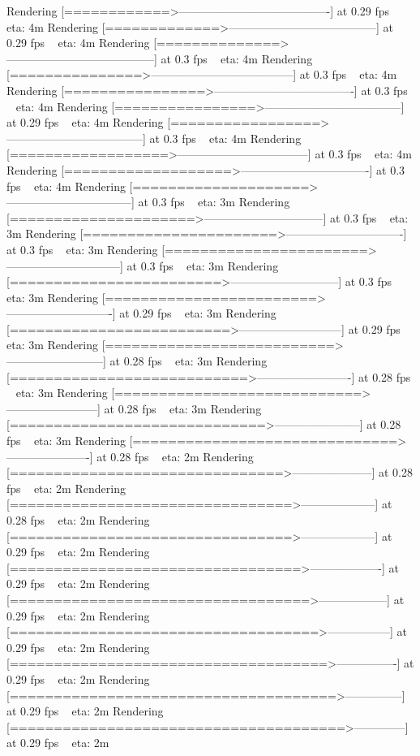 \documentclass{article}\usepackage[]{graphicx}\usepackage[]{color}
\begin{document}
Rendering [============>----------------------------------------] at 0.29 fps ~ eta:  4m
Rendering [=============>---------------------------------------] at 0.29 fps ~ eta:  4m
Rendering [==============>---------------------------------------] at 0.3 fps ~ eta:  4m
Rendering [===============>--------------------------------------] at 0.3 fps ~ eta:  4m
Rendering [================>-------------------------------------] at 0.3 fps ~ eta:  4m
Rendering [================>------------------------------------] at 0.29 fps ~ eta:  4m
Rendering [=================>------------------------------------] at 0.3 fps ~ eta:  4m
Rendering [==================>-----------------------------------] at 0.3 fps ~ eta:  4m
Rendering [===================>----------------------------------] at 0.3 fps ~ eta:  4m
Rendering [====================>---------------------------------] at 0.3 fps ~ eta:  3m
Rendering [=====================>--------------------------------] at 0.3 fps ~ eta:  3m
Rendering [======================>-------------------------------] at 0.3 fps ~ eta:  3m
Rendering [=======================>------------------------------] at 0.3 fps ~ eta:  3m
Rendering [========================>-----------------------------] at 0.3 fps ~ eta:  3m
Rendering [========================>----------------------------] at 0.29 fps ~ eta:  3m
Rendering [=========================>---------------------------] at 0.29 fps ~ eta:  3m
Rendering [==========================>--------------------------] at 0.28 fps ~ eta:  3m
Rendering [===========================>-------------------------] at 0.28 fps ~ eta:  3m
Rendering [============================>------------------------] at 0.28 fps ~ eta:  3m
Rendering [=============================>-----------------------] at 0.28 fps ~ eta:  3m
Rendering [==============================>----------------------] at 0.28 fps ~ eta:  2m
Rendering [===============================>---------------------] at 0.28 fps ~ eta:  2m
Rendering [================================>--------------------] at 0.28 fps ~ eta:  2m
Rendering [================================>--------------------] at 0.29 fps ~ eta:  2m
Rendering [=================================>-------------------] at 0.29 fps ~ eta:  2m
Rendering [==================================>------------------] at 0.29 fps ~ eta:  2m
Rendering [===================================>-----------------] at 0.29 fps ~ eta:  2m
Rendering [====================================>----------------] at 0.29 fps ~ eta:  2m
Rendering [=====================================>---------------] at 0.29 fps ~ eta:  2m
Rendering [======================================>--------------] at 0.29 fps ~ eta:  2m
\end{document}
